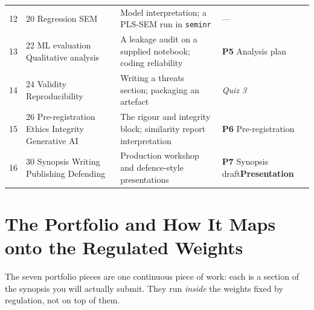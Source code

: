 \begin{center}
\begin{longtable}{@{}L{1.2cm}L{4.0cm}L{5.0cm}L{3.9cm}@{}}
12 & 20 Regression SEM
  & Model interpretation; a PLS-SEM run in \texttt{seminr}
  & --- \\
13 & 22 ML evaluation Qualitative analysis
  & A leakage audit on a supplied notebook; coding reliability
  & \textbf{P5} Analysis plan \\
14 & 24 Validity Reproducibility
  & Writing a threats section; packaging an artefact
  & \emph{Quiz 3} \\
15 & 26 Pre-registration Ethics Integrity Generative AI
  & The rigour and integrity block; similarity report interpretation
  & \textbf{P6} Pre-registration \\
16 & 30 Synopsis Writing Publishing Defending
  & Production workshop and defence-style presentations
  & \textbf{P7} Synopsis draft\newline \textbf{Presentation} \\
\end{longtable}
\end{center}

\section{The Portfolio and How It Maps onto the Regulated Weights}

The seven portfolio pieces are one continuous piece of work: each is a section
of the synopsis you will actually submit. They run \emph{inside} the weights
fixed by regulation, not on top of them.

